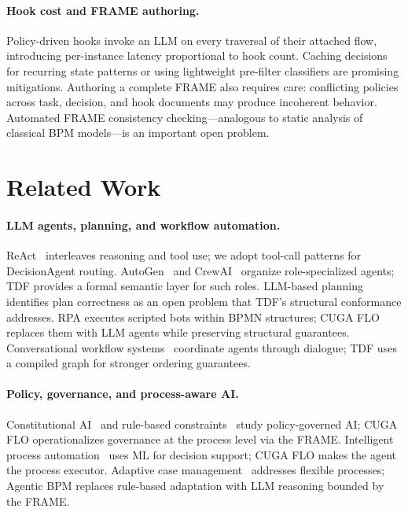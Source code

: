 \documentclass[11pt,a4paper]{article}
\begin{document}
\paragraph{Hook cost and FRAME authoring.}
Policy-driven hooks invoke an LLM on every traversal of their attached flow,
introducing per-instance latency proportional to hook count. Caching decisions for
recurring state patterns or using lightweight pre-filter classifiers are promising
mitigations. Authoring a complete FRAME also requires care: conflicting policies
across task, decision, and hook documents may produce incoherent behavior.
Automated FRAME consistency checking---analogous to static analysis of classical
BPM models---is an important open problem.

\section{Related Work}
\label{sec:related}

\paragraph{LLM agents, planning, and workflow automation.}
ReAct~\cite{yao2022react} interleaves reasoning and tool use; we adopt tool-call
patterns for DecisionAgent routing. AutoGen~\cite{wu2023autogen} and
CrewAI~\cite{crewai2024} organize role-specialized agents; TDF provides a formal
semantic layer for such roles. LLM-based planning~\cite{kambhampati2024llm}
identifies plan correctness as an open problem that TDF's structural conformance
addresses. RPA executes scripted bots within BPMN structures; CUGA FLO replaces
them with LLM agents while preserving structural guarantees. Conversational
workflow systems~\cite{qian2024chatdev} coordinate agents through dialogue; TDF
uses a compiled graph for stronger ordering guarantees.

\paragraph{Policy, governance, and process-aware AI.}
Constitutional AI~\cite{bai2022constitutional} and rule-based
constraints~\cite{perez2021selfdiagnosis} study policy-governed AI; CUGA FLO
operationalizes governance at the process level via the FRAME. Intelligent process
automation~\cite{geyer2021intelligent} uses ML for decision support; CUGA FLO
makes the agent the process executor. Adaptive case
management~\cite{swenson2010mastering} addresses flexible processes; Agentic BPM
replaces rule-based adaptation with LLM reasoning bounded by the FRAME.
\end{document}
